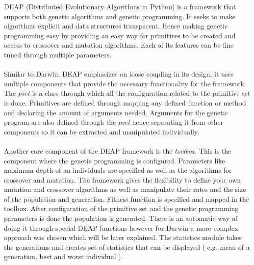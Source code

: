 DEAP (Distributed Evolutionary Algorithms in Python) is a framework that supports both genetic algorithms and genetic programming.
It seeks to make algorithms explicit and data structures transparent. Hence making genetic programming easy by providing an easy way for primitives
to be created and access to crossover and mutation algorithms. Each of its features can be fine tuned through multiple parameters.
\paragraph{}
Similar to Darwin, DEAP emphasizes on loose coupling in its design, it uses multiple components that provide the necessary functionality
for the framework. The \textit{pset} is a class through which all the configuration related to the primitive set is done. Primitives are defined
through mapping any defined function or method and declaring the amount of arguments needed. Arguments for the genetic program are also defined through the \textit{pset} hence 
separating it from other components so it can be extracted and manipulated individually.
\paragraph{}
Another core component of the DEAP framework is the \textit{toolbox}. This is the component where the genetic programming is configured. Parameters
like maximum depth of an individuals are specified as well as the algorithms for crossover and mutation. The framework gives the flexibility to define your
own mutation and crossover algorithms as well as manipulate their rates and the size of the population and generation. Fitness function is specified and
mapped in the toolbox. After configuration of the primitive set and the genetic
programming parameters is done the population is generated. There is an automatic way of doing it through special DEAP functions however for Darwin
a more complex approach was chosen which will be later explained. The statistics module takes the generations and creates
set of statistics that can be displayed ( e.g. mean of a generation, best and worst individual ).


